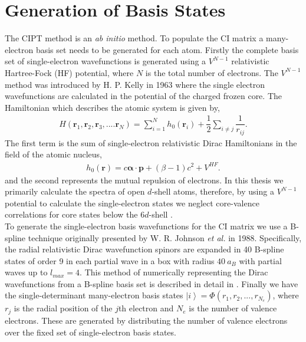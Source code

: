 \documentclass[10pt,a4paper, twoside, openright]{report}
\begin{document}
\section{Generation of Basis States} \label{sec:HF}
The CIPT method is an \textit{ab initio} method. To populate the CI matrix a many-electron basis set needs to be generated for each atom. Firstly the complete basis set of single-electron wavefunctions is generated using a $V^{N-1}$ relativistic Hartree-Fock (HF) potential, where $N$ is the total number of electrons. The $V^{N-1}$ method was introduced by H. P. Kelly in 1963 \cite{Kelly1963_1, Kelly1964} where the single electron wavefunctions are calculated in the potential of the charged frozen core.  The Hamiltonian which describes the atomic system is given by,
\begin{align}
H\left(\textbf{r}_1,\textbf{r}_2, \textbf{r}_3, .... \textbf{r}_N\right) = \sum_{i=1}^{N} h_0\left(\textbf{r}_i\right) + \dfrac{1}{2}\sum_{i\neq j}\dfrac{1}{r_{ij}}.
\end{align}
The first term is the sum of single-electron relativistic Dirac Hamiltonians in the field of the atomic nucleus,
\begin{align*}
h_0\left(\textbf{r}\right) = c \boldsymbol{\alpha}\cdot\textbf{p} + (\beta - 1) c^2 + V^{HF}.
\end{align*}
and the second represents the mutual repulsion of electrons.   In this thesis we primarily calculate the spectra of open $d$-shell atoms, therefore, by using a $V^{N-1}$ potential to calculate the single-electron states we neglect core-valence correlations for core states below the $6d$-shell \cite{DBHF2017}. \\
\linebreak
To generate the single-electron basis wavefunctions for the CI matrix we use a  B-spline technique originally presented by W. R. Johnson \textit{et al.} in 1988\cite{Johnson1988}.  Specifically, the radial relativistic Dirac wavefunction spinors are expanded in  40 B-spline states of order 9 in each partial wave in a box with radius $40 \ a_B$ with partial waves up to $l_{max}=4$. This method of numerically representing the Dirac wavefunctions from a B-spline basis set is described in detail in \cite{JohnsonAST}.  Finally we have the single-determinant many-electron basis states $\left|i\right> = \Phi\left(r_1, r_2, ... , r_{N_e}\right)$, where $r_j$ is the radial position of the $j$th electron and $N_e$ is the number of valence electrons. These are generated by distributing the number of valence electrons over the fixed set of single-electron basis states.
\end{document}
